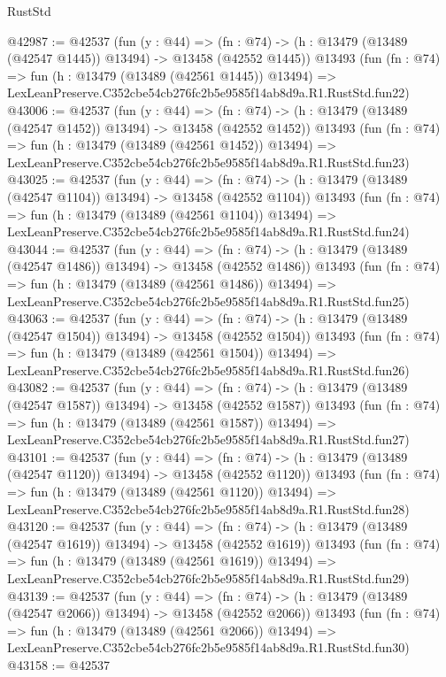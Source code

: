 \begin{lexlean}{RustStd}
\begin{coremodule}
@42987 := @42537
    (fun (y : @44) =>
    (fn : @74) -> (h : @13479 (@13489 (@42547 @1445)) @13494) -> @13458 (@42552 @1445))
    @13493
    (fun (fn : @74) =>
    fun (h : @13479 (@13489 (@42561 @1445)) @13494) =>
    LexLeanPreserve.C352cbe54cb276fc2b5e9585f14ab8d9a.R1.RustStd.fun22)
@43006 := @42537
    (fun (y : @44) =>
    (fn : @74) -> (h : @13479 (@13489 (@42547 @1452)) @13494) -> @13458 (@42552 @1452))
    @13493
    (fun (fn : @74) =>
    fun (h : @13479 (@13489 (@42561 @1452)) @13494) =>
    LexLeanPreserve.C352cbe54cb276fc2b5e9585f14ab8d9a.R1.RustStd.fun23)
@43025 := @42537
    (fun (y : @44) =>
    (fn : @74) -> (h : @13479 (@13489 (@42547 @1104)) @13494) -> @13458 (@42552 @1104))
    @13493
    (fun (fn : @74) =>
    fun (h : @13479 (@13489 (@42561 @1104)) @13494) =>
    LexLeanPreserve.C352cbe54cb276fc2b5e9585f14ab8d9a.R1.RustStd.fun24)
@43044 := @42537
    (fun (y : @44) =>
    (fn : @74) -> (h : @13479 (@13489 (@42547 @1486)) @13494) -> @13458 (@42552 @1486))
    @13493
    (fun (fn : @74) =>
    fun (h : @13479 (@13489 (@42561 @1486)) @13494) =>
    LexLeanPreserve.C352cbe54cb276fc2b5e9585f14ab8d9a.R1.RustStd.fun25)
@43063 := @42537
    (fun (y : @44) =>
    (fn : @74) -> (h : @13479 (@13489 (@42547 @1504)) @13494) -> @13458 (@42552 @1504))
    @13493
    (fun (fn : @74) =>
    fun (h : @13479 (@13489 (@42561 @1504)) @13494) =>
    LexLeanPreserve.C352cbe54cb276fc2b5e9585f14ab8d9a.R1.RustStd.fun26)
@43082 := @42537
    (fun (y : @44) =>
    (fn : @74) -> (h : @13479 (@13489 (@42547 @1587)) @13494) -> @13458 (@42552 @1587))
    @13493
    (fun (fn : @74) =>
    fun (h : @13479 (@13489 (@42561 @1587)) @13494) =>
    LexLeanPreserve.C352cbe54cb276fc2b5e9585f14ab8d9a.R1.RustStd.fun27)
@43101 := @42537
    (fun (y : @44) =>
    (fn : @74) -> (h : @13479 (@13489 (@42547 @1120)) @13494) -> @13458 (@42552 @1120))
    @13493
    (fun (fn : @74) =>
    fun (h : @13479 (@13489 (@42561 @1120)) @13494) =>
    LexLeanPreserve.C352cbe54cb276fc2b5e9585f14ab8d9a.R1.RustStd.fun28)
@43120 := @42537
    (fun (y : @44) =>
    (fn : @74) -> (h : @13479 (@13489 (@42547 @1619)) @13494) -> @13458 (@42552 @1619))
    @13493
    (fun (fn : @74) =>
    fun (h : @13479 (@13489 (@42561 @1619)) @13494) =>
    LexLeanPreserve.C352cbe54cb276fc2b5e9585f14ab8d9a.R1.RustStd.fun29)
@43139 := @42537
    (fun (y : @44) =>
    (fn : @74) -> (h : @13479 (@13489 (@42547 @2066)) @13494) -> @13458 (@42552 @2066))
    @13493
    (fun (fn : @74) =>
    fun (h : @13479 (@13489 (@42561 @2066)) @13494) =>
    LexLeanPreserve.C352cbe54cb276fc2b5e9585f14ab8d9a.R1.RustStd.fun30)
@43158 := @42537

\end{coremodule}
\end{lexlean}
